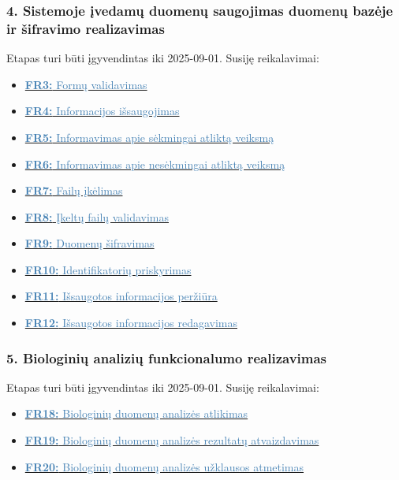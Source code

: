 \documentclass[12pt]{article}
\begin{document}
\subsubsection*{\noindent \textbf{4.} Sistemoje įvedamų duomenų saugojimas
duomenų bazėje ir šifravimo realizavimas}

\noindent Etapas turi būti įgyvendintas iki 2025-09-01. Susiję reikalavimai:

\begin{itemize}[leftmargin=0.3cm, itemsep=-7pt, topsep=1pt, after=\vspace{-1em}]
    \item \hyperlink{FR3}{\textcolor{steelblue}{\textbf{FR3:} Formų
    validavimas}}
    \item \hyperlink{FR4}{\textcolor{steelblue}{\textbf{FR4:} Informacijos
    išsaugojimas}}
    \item \hyperlink{FR5}{\textcolor{steelblue}{\textbf{FR5:} Informavimas apie
    sėkmingai atliktą veiksmą}}
    \item \hyperlink{FR6}{\textcolor{steelblue}{\textbf{FR6:} Informavimas apie
    nesėkmingai atliktą veiksmą}}
    \item \hyperlink{FR7}{\textcolor{steelblue}{\textbf{FR7:} Failų įkėlimas}}
    \item \hyperlink{FR8}{\textcolor{steelblue}{\textbf{FR8:} Įkeltų failų
    validavimas}}
    \item \hyperlink{FR9}{\textcolor{steelblue}{\textbf{FR9:} Duomenų
    šifravimas}}
    \item \hyperlink{FR10}{\textcolor{steelblue}{\textbf{FR10:} Identifikatorių
    priskyrimas}}
    \item \hyperlink{FR11}{\textcolor{steelblue}{\textbf{FR11:} Išsaugotos
    informacijos peržiūra}}
    \item \hyperlink{FR12}{\textcolor{steelblue}{\textbf{FR12:} Išsaugotos
    informacijos redagavimas}}
\end{itemize}

\subsubsection*{\noindent \textbf{5.} Biologinių analizių funkcionalumo
realizavimas}

\noindent Etapas turi būti įgyvendintas iki 2025-09-01. Susiję reikalavimai:

\begin{itemize}[leftmargin=0.3cm, itemsep=-7pt, topsep=1pt, after=\vspace{-1em}]
    \item \hyperlink{FR18}{\textcolor{steelblue}{\textbf{FR18:} Biologinių
    duomenų analizės atlikimas}}
    \item \hyperlink{FR19}{\textcolor{steelblue}{\textbf{FR19:} Biologinių
    duomenų analizės rezultatų atvaizdavimas}}
    \item \hyperlink{FR20}{\textcolor{steelblue}{\textbf{FR20:} Biologinių
    duomenų analizės užklausos atmetimas}}
\end{itemize}
\end{document}
